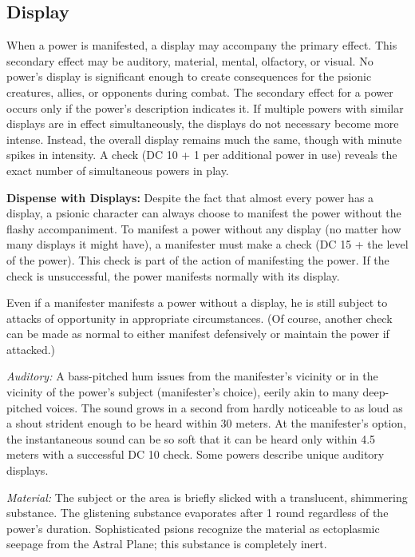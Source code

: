 \subsection{Display}
When a power is manifested, a display may accompany the primary effect. This secondary effect may be auditory, material, mental, olfactory, or visual. No power's display is significant enough to create consequences for the psionic creatures, allies, or opponents during combat. The secondary effect for a power occurs only if the power's description indicates it. If multiple powers with similar displays are in effect simultaneously, the displays do not necessary become more intense. Instead, the overall display remains much the same, though with minute spikes in intensity. A  check (DC 10 + 1 per additional power in use) reveals the exact number of simultaneous powers in play.

\textbf{Dispense with Displays:} Despite the fact that almost every power has a display, a psionic character can always choose to manifest the power without the flashy accompaniment. To manifest a power without any display (no matter how many displays it might have), a manifester must make a  check (DC 15 + the level of the power). This check is part of the action of manifesting the power. If the check is unsuccessful, the power manifests normally with its display.

Even if a manifester manifests a power without a display, he is still subject to attacks of opportunity in appropriate circumstances. (Of course, another  check can be made as normal to either manifest defensively or maintain the power if attacked.)

\textit{Auditory:} A bass-pitched hum issues from the manifester's vicinity or in the vicinity of the power's subject (manifester's choice), eerily akin to many deep-pitched voices. The sound grows in a second from hardly noticeable to as loud as a shout strident enough to be heard within 30 meters. At the manifester's option, the instantaneous sound can be so soft that it can be heard only within 4.5 meters with a successful DC 10  check. Some powers describe unique auditory displays.

\textit{Material:} The subject or the area is briefly slicked with a translucent, shimmering substance. The glistening substance evaporates after 1 round regardless of the power's duration. Sophisticated psions recognize the material as ectoplasmic seepage from the Astral Plane; this substance is completely inert.

